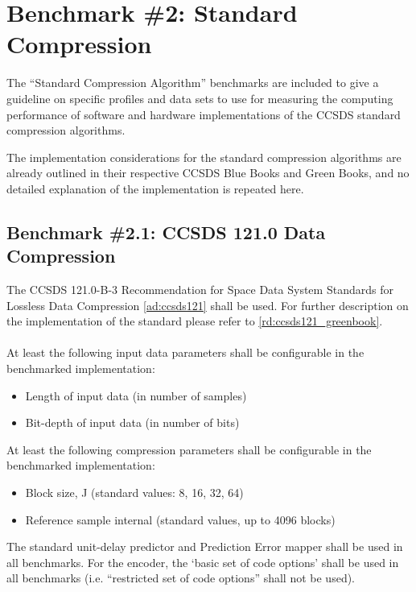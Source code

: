 \section{Benchmark \#2: Standard Compression}
The “Standard Compression Algorithm” benchmarks are included to give a guideline on specific profiles and data sets to use for measuring the computing performance of software and hardware implementations of the CCSDS standard compression algorithms.  

The implementation considerations for the standard compression algorithms are already outlined in their respective CCSDS Blue Books and Green Books, and no detailed explanation of the implementation is repeated here.

\subsection{Benchmark \#2.1: CCSDS 121.0 Data Compression}
The CCSDS 121.0-B-3 Recommendation for Space Data System Standards for Lossless Data Compression \ref{ad:ccsds121} shall be used. For further description on the implementation of the standard please refer to \ref{rd:ccsds121_greenbook}. 
\\
\\
At least the following input data parameters shall be configurable in the benchmarked implementation: 
\begin{itemize}
    \item Length of input data (in number of samples)
    \item Bit-depth of input data (in number of bits)
\end{itemize}

At least the following compression parameters shall be configurable in the benchmarked implementation: 
\begin{itemize}
    \item Block size, J (standard values: 8, 16, 32, 64)
    \item Reference sample internal (standard values, up to 4096 blocks)
\end{itemize}

The standard unit-delay predictor and Prediction Error mapper shall be used in all benchmarks. For the encoder, the ‘basic set of code options’ shall be used in all benchmarks (i.e. “restricted set of code options” shall not be used). 

